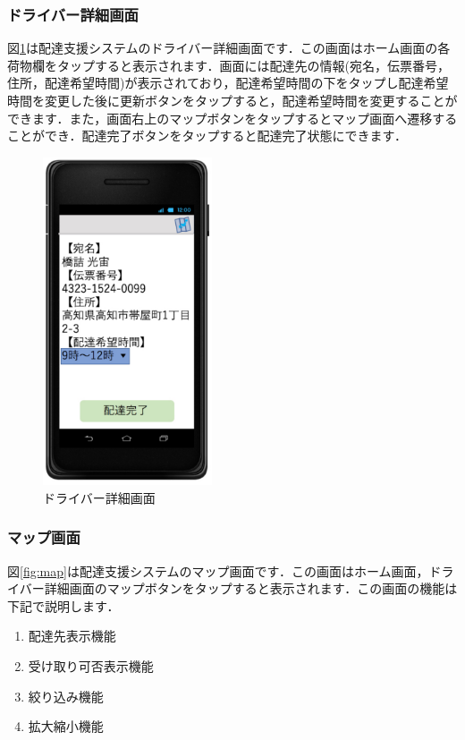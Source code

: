 \documentclass[a4j,titlepage]{jarticle}
\begin{document}
\subsubsection{ドライバー詳細画面}
図\ref{fig:driver_details}は配達支援システムのドライバー詳細画面です．この画面はホーム画面の各荷物欄をタップすると表示されます．画面には配達先の情報(宛名，伝票番号，住所，配達希望時間)が表示されており，配達希望時間の下をタップし配達希望時間を変更した後に更新ボタンをタップすると，配達希望時間を変更することができます．また，画面右上のマップボタンをタップするとマップ画面へ遷移することができ．配達完了ボタンをタップすると配達完了状態にできます．
\begin{figure}[htbp]
 \begin{center}
  \includegraphics[width=50mm]{driver_details}
	\caption{ドライバー詳細画面}
	\label{fig:driver_details}
 \end{center}

\end{figure}




\subsubsection{マップ画面}
図\ref{fig:map}は配達支援システムのマップ画面です．この画面はホーム画面，ドライバー詳細画面のマップボタンをタップすると表示されます．この画面の機能は下記で説明します．
\begin{enumerate}
	\item 配達先表示機能\\

	\item 受け取り可否表示機能\\

	\item 絞り込み機能\\

	\item 拡大縮小機能\\

\end{enumerate}
\end{document}
